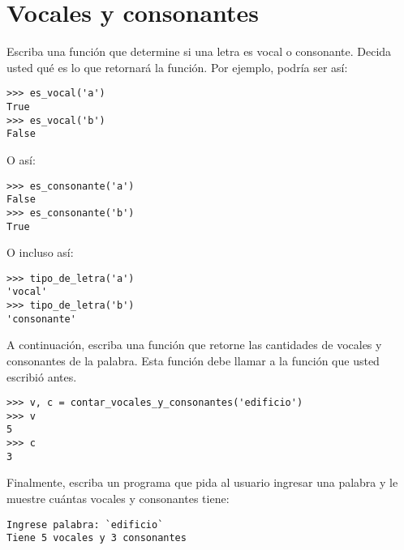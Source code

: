 \section{Vocales y consonantes}

Escriba una función que determine si una letra es vocal o consonante.
Decida usted qué es lo que retornará la función. Por ejemplo, podría ser
así:
%
\begin{lstlisting}
>>> es_vocal('a')
True
>>> es_vocal('b')
False
\end{lstlisting}
%
O así:
%
\begin{lstlisting}
>>> es_consonante('a')
False
>>> es_consonante('b')
True
\end{lstlisting}
%
O incluso así:
%
\begin{lstlisting}
>>> tipo_de_letra('a')
'vocal'
>>> tipo_de_letra('b')
'consonante'
\end{lstlisting}

A continuación, escriba una función
que retorne las cantidades de vocales y consonantes de la palabra.
Esta función debe llamar a la función que usted escribió antes.

\begin{lstlisting}
>>> v, c = contar_vocales_y_consonantes('edificio')
>>> v
5
>>> c
3
\end{lstlisting}

Finalmente, escriba un programa que pida al usuario ingresar una palabra
y le muestre cuántas vocales y consonantes tiene:
%
\begin{lstlisting}[language=testcase]
Ingrese palabra: `edificio`
Tiene 5 vocales y 3 consonantes
\end{lstlisting}
